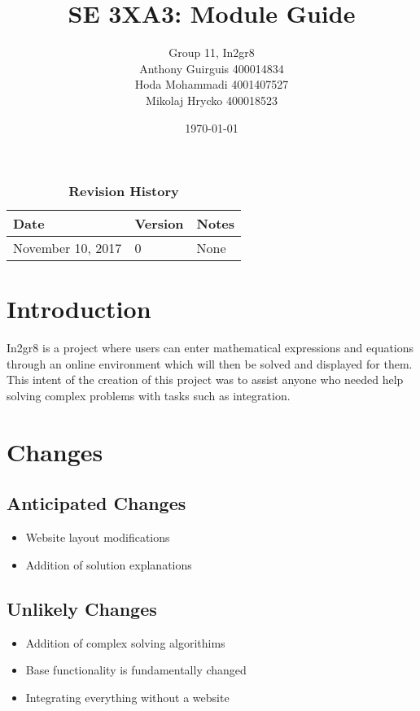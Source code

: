 \documentclass[12pt, titlepage]{article}
\title{SE 3XA3: Module Guide}
\author{Group 11, In2gr8
		\\ Anthony Guirguis 400014834
		\\ Hoda Mohammadi 4001407527
		\\ Mikolaj Hrycko 400018523
}
\date{\today}
\begin{document}
\maketitle

\tableofcontents
\listoftables
\listoffigures

\begin{table}[bp]
\caption{\bf Revision History}
\begin{tabularx}{\textwidth}{p{3cm}p{2cm}X}
\toprule {\bf Date} & {\bf Version} & {\bf Notes}\\
\midrule
November 10, 2017 & 0 & None\\
\bottomrule
\end{tabularx}
\end{table}

\newpage


\newpage
{}
\section {Introduction}
In2gr8 is a project where users can enter mathematical expressions and equations through an online environment which will then be solved and displayed for them. This intent of the creation of this project was to assist anyone who needed help solving complex problems with tasks such as integration.

\section{Changes}
\subsection*{Anticipated Changes}
\begin{itemize}
\item Website layout modifications
\item Addition of solution explanations
\end{itemize}

\subsection*{Unlikely Changes}
\begin{itemize}
\item Addition of complex solving algorithims
\item Base functionality is fundamentally changed
\item Integrating everything without a website
\end{itemize}
\end{document}
